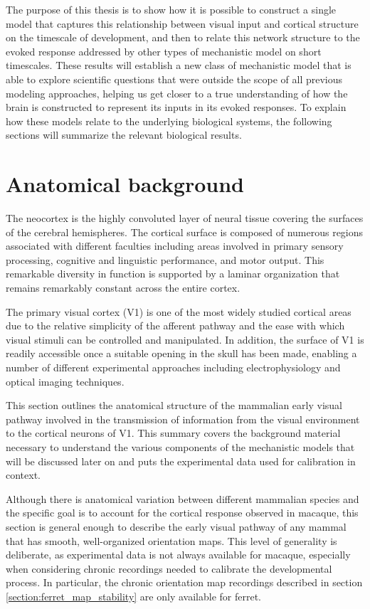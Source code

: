 \documentclass[phd,ianc,twoside]{infthesis}
\begin{document}
The purpose of this thesis is to show how it is possible to construct a
single model that captures this relationship between visual input and
cortical structure on the timescale of development, and then to relate
this network structure to the evoked response addressed by other types
of mechanistic model on short timescales. These results will establish
a new class of mechanistic model that is able to explore
scientific questions that were outside the scope of all previous
modeling approaches, helping us get closer to a true understanding of
how the brain is constructed to represent its inputs in its evoked responses.
To explain how these models relate to the underlying biological
systems, the following sections will summarize the relevant biological
results.


\section{Anatomical background}

The neocortex is the highly convoluted layer of neural tissue covering
the surfaces of the cerebral hemispheres. The cortical surface is
composed of numerous regions associated with different faculties
including areas involved in primary sensory processing, cognitive and
linguistic performance, and motor output. This remarkable diversity in
function is supported by a laminar organization that remains remarkably
constant across the entire cortex.

The primary visual cortex (V1) is one of the most widely studied
cortical areas due to the relative simplicity of the afferent pathway
and the ease with which visual stimuli can be controlled and
manipulated. In addition, the surface of V1 is readily accessible
once a suitable opening in the skull has been made, enabling a number of
different experimental approaches including electrophysiology and
optical imaging techniques.

This section outlines the anatomical structure of the mammalian
early visual pathway involved in the transmission of information from
the visual environment to the cortical neurons of V1. This summary
covers the background material necessary to understand the various
components of the mechanistic models that will be discussed later on and
puts the experimental data used for calibration in context.

Although there is anatomical variation between different mammalian
species and the specific goal is to account for the cortical response
observed in macaque, this section is general enough to describe the
early visual pathway of any mammal that has smooth, well-organized
orientation maps. This level of generality is
deliberate, as experimental data is not always available for macaque,
especially when considering chronic recordings needed to calibrate the
developmental process. In particular, the chronic orientation map
recordings described in section \ref{section:ferret_map_stability} are
only available for ferret.
\end{document}
